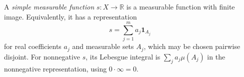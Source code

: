 
A \emph{simple measurable function} $s:X\to\mathbb R$ is a measurable function with finite image. Equivalently, it has a representation
\[
s=\sum_{j=1}^{m}a_j\mathbf1_{A_j}
\]
for real coefficients $a_j$ and measurable sets $A_j$, which may be chosen pairwise disjoint. For nonnegative $s$, its Lebesgue integral is $\sum_j a_j\mu(A_j)$ in the nonnegative representation, using $0\cdot\infty=0$.
